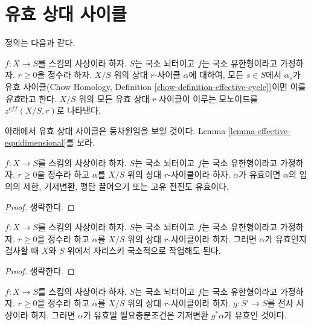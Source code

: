 \section{유효 상대 사이클}
\label{section-effective}


\noindent
정의는 다음과 같다.

\begin{definition}
\label{definition-effective}
$f : X \to S$를 스킴의 사상이라 하자. $S$는 국소 뇌터이고 $f$는
국소 유한형이라고 가정하자. $r \geq 0$을 정수라 하자. $X/S$ 위의
상대 $r$-사이클 $\alpha$에 대하여, 모든 $s \in S$에서 $\alpha_s$가
유효 사이클(Chow Homology, Definition
\ref{chow-definition-effective-cycle})이면 이를 {\it 유효}라고 한다.
$X/S$ 위의 모든 유효 상대 $r$-사이클이 이루는 모노이드를
$z^{eff}(X/S, r)$로 나타낸다.
\end{definition}

\noindent
아래에서 유효 상대 사이클은 등차원임을 보일 것이다. Lemma
\ref{lemma-effective-equidimensional}를 보라.

\begin{lemma}
\label{lemma-effective-functoriality}
$f : X \to S$를 스킴의 사상이라 하자. $S$는 국소 뇌터이고 $f$는
국소 유한형이라고 가정하자. $r \geq 0$을 정수라 하고 $\alpha$를
$X/S$ 위의 상대 $r$-사이클이라 하자. $\alpha$가 유효이면 $\alpha$의
임의의 제한, 기저변환, 평탄 끌어오기 또는 고유 전진도 유효이다.
\end{lemma}

\begin{proof}
생략한다.
\end{proof}

\begin{lemma}
\label{lemma-check-effective}
$f : X \to S$를 스킴의 사상이라 하자. $S$는 국소 뇌터이고 $f$는
국소 유한형이라고 가정하자. $r \geq 0$을 정수라 하고 $\alpha$를
$X/S$ 위의 상대 $r$-사이클이라 하자. 그러면 $\alpha$가 유효인지
검사할 때 $X$와 $S$ 위에서 자리스키 국소적으로 작업해도 된다.
\end{lemma}

\begin{proof}
생략한다.
\end{proof}

\begin{lemma}
\label{lemma-effective-descent}
$f : X \to S$를 스킴의 사상이라 하자. $S$는 국소 뇌터이고 $f$는
국소 유한형이라고 가정하자. $r \geq 0$을 정수라 하고 $\alpha$를
$X/S$ 위의 상대 $r$-사이클이라 하자. $g : S' \to S$를 전사 사상이라
하자. 그러면 $\alpha$가 유효일 필요충분조건은 기저변환 $g^*\alpha$가
유효인 것이다.
\end{lemma}

